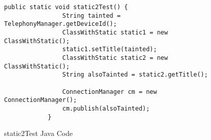 \documentclass[../draft.tex]{subfiles}
\begin{document}
    \begin{figure}
        \centering
        \begin{lstlisting}[gobble=12]
            public static void static2Test() {
                String tainted = TelephonyManager.getDeviceId();
                ClassWithStatic static1 = new ClassWithStatic();
                static1.setTitle(tainted);
                ClassWithStatic static2 = new ClassWithStatic();
                String alsoTainted = static2.getTitle();
                
                ConnectionManager cm = new ConnectionManager();
                cm.publish(alsoTainted);
            }
        \end{lstlisting}
        \caption{static2Test Java Code}
        \label{lst:static2TestJava}
    \end{figure}
\end{document}
